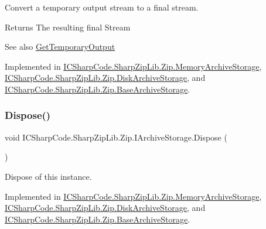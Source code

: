Convert a temporary output stream to a final stream. 

\begin{DoxyReturn}{Returns}
The resulting final Stream
\end{DoxyReturn}
\begin{DoxySeeAlso}{See also}
\hyperlink{interface_i_c_sharp_code_1_1_sharp_zip_lib_1_1_zip_1_1_i_archive_storage_aa8c04ba6ece88eb03473135299de0a43}{Get\+Temporary\+Output}


\end{DoxySeeAlso}


Implemented in \hyperlink{class_i_c_sharp_code_1_1_sharp_zip_lib_1_1_zip_1_1_memory_archive_storage_a15c32e570f6ac74b5909cae3e22d84f4}{I\+C\+Sharp\+Code.\+Sharp\+Zip\+Lib.\+Zip.\+Memory\+Archive\+Storage}, \hyperlink{class_i_c_sharp_code_1_1_sharp_zip_lib_1_1_zip_1_1_disk_archive_storage_a90e6fad96f28a6539c5ea2b4a0ac28c0}{I\+C\+Sharp\+Code.\+Sharp\+Zip\+Lib.\+Zip.\+Disk\+Archive\+Storage}, and \hyperlink{class_i_c_sharp_code_1_1_sharp_zip_lib_1_1_zip_1_1_base_archive_storage_ab20872fd7a5c31f1765bc36f3a37040f}{I\+C\+Sharp\+Code.\+Sharp\+Zip\+Lib.\+Zip.\+Base\+Archive\+Storage}.

\mbox{\label{interface_i_c_sharp_code_1_1_sharp_zip_lib_1_1_zip_1_1_i_archive_storage_ab0d4fb8b0557395851488846515ae64d}} 
\subsubsection{\texorpdfstring{Dispose()}{Dispose()}}
{\footnotesize\ttfamily void I\+C\+Sharp\+Code.\+Sharp\+Zip\+Lib.\+Zip.\+I\+Archive\+Storage.\+Dispose (\begin{DoxyParamCaption}{ }\end{DoxyParamCaption})}



Dispose of this instance. 



Implemented in \hyperlink{class_i_c_sharp_code_1_1_sharp_zip_lib_1_1_zip_1_1_memory_archive_storage_acb1d6118fd6a693de793dd704b641ecc}{I\+C\+Sharp\+Code.\+Sharp\+Zip\+Lib.\+Zip.\+Memory\+Archive\+Storage}, \hyperlink{class_i_c_sharp_code_1_1_sharp_zip_lib_1_1_zip_1_1_disk_archive_storage_a55cb8ad8e73dcd8196fce9c0b41336d9}{I\+C\+Sharp\+Code.\+Sharp\+Zip\+Lib.\+Zip.\+Disk\+Archive\+Storage}, and \hyperlink{class_i_c_sharp_code_1_1_sharp_zip_lib_1_1_zip_1_1_base_archive_storage_a570815be2a90ac68ada8a48eb4f5415b}{I\+C\+Sharp\+Code.\+Sharp\+Zip\+Lib.\+Zip.\+Base\+Archive\+Storage}.

